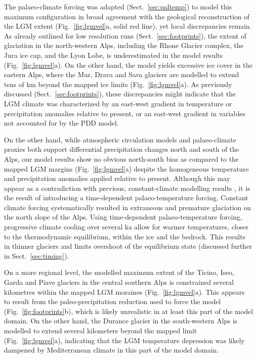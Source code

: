 \documentclass[tc, manuscript]{copernicus}
\begin{document}
    The palaeo-climate forcing was adapted (Sect.~\ref{sec:paltemp})
    to model this maximum configuration in broad agreement with the geological
    reconstruction of the LGM extent (Fig.~\ref{fig:lgmvel}a, solid red line),
    yet local discrepancies remain. As already outlined for low resolution
    runs (Sect.~\ref{sec:footprints}), the extent of glaciation in the
    north-western Alps, including the Rhone Glacier complex, the Jura ice cap,
    and the Lyon Lobe, is underestimated in the model results
    (Fig.~\ref{fig:lgmvel}a). On the other hand, the model yields excessive ice
    cover in the eastern Alps, where the Mur, Drava and Sava glaciers are
    modelled to extend tens of km beyond the mapped ice limits
    (Fig.~\ref{fig:lgmvel}a). As previously discussed
    (Sect.~\ref{sec:footprints}), these discrepancies might indicate that the
    LGM climate was characterized by an east-west gradient in temperature
    \citep[cf.][]{Heyman.etal.2013} or precipitation
    \citep[cf.][]{Wu.etal.2007} anomalies relative to present, or an east-west
    gradient in variables not accounted for by the PDD model.

    On the other hand, while atmospheric circulation models
    \citep{Strandberg.etal.2011, Ludwig.etal.2016} and palaeo-climate proxies
    \citep{Luetscher.etal.2015} both support differential precipitation changes
    north and south of the Alps, our model results show no obvious north-south
    bias as compared to the mapped LGM margins (Fig.~\ref{fig:lgmvel}a) despite
    the homogeneous temperature and precipitation anomalies applied relative to
    present. Although this may appear as a contradiction with previous,
    constant-climate modelling results \citep{Becker.etal.2016}, it is the
    result of introducing a time-dependent palaeo-temperature forcing. Constant
    climate forcing systematically resulted in extraneous
    \citep[Fig.~3]{Becker.etal.2016} and premature
    \citep[Fig.~4]{Becker.etal.2016} glaciation on the north slope of the Alps.
    Using time-dependent palaeo-temperature forcing, progressive climate
    cooling over several ka allow for warmer temperatures, closer to
    the thermodynamic equilibrium, within the ice and the bedrock. This results
    in thinner glaciers and limits overshoot of the equilibrium state
    (discussed further in Sect.~\ref{sec:timing}).

    On a more regional level, the modelled maximum extent of the Ticino, Iseo,
    Garda and Piave glaciers in the central southern Alps is constrained
    several kilometres within the mapped LGM moraines (Fig.~\ref{fig:lgmvel}a).
    This appears to result
    from the paleo-precipitation reduction used to force the model
    (Fig.~\ref{fig:footprints}b), which is likely unrealistic in at least this
    part of the model domain. On the other hand, the Durance glacier in the
    south-western Alps is modelled to extend several kilometers beyond the
    mapped limit (Fig.~\ref{fig:lgmvel}a), indicating that the LGM temperature
    depression was likely
    dampened by Mediterranean climate in this part of the model domain.
\end{document}
